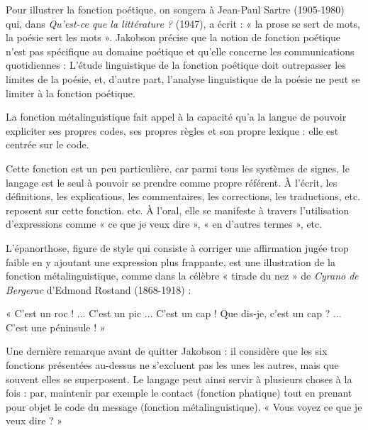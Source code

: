 \begin{bbcomplement}{}
Pour illustrer la fonction poétique, on songera à Jean-Paul Sartre (1905-1980) qui, dans \textit{Qu’est-ce que la littérature ?} (1947), a écrit : « la prose se sert de mots, la poésie sert les mots ». Jakobson précise que la notion de fonction poétique n’est pas spécifique au domaine poétique et qu’elle concerne les communications quotidiennes :
L’étude linguistique de la fonction poétique doit outrepasser les limites de la poésie, et, d’autre part, l’analyse linguistique de la poésie ne peut se limiter à la fonction poétique.
\end{bbcomplement}

La fonction métalinguistique fait appel à la capacité qu’a la langue de pouvoir expliciter ses propres codes, ses propres règles et son propre lexique : elle est centrée sur le code.

Cette fonction est un peu particulière, car parmi tous les systèmes de signes, le langage est le seul à pouvoir se prendre comme propre référent. À l’écrit, les définitions, les explications, les commentaires, les corrections, les traductions, etc. reposent sur cette fonction. etc. À l’oral, elle se manifeste à travers l’utilisation d’expressions comme « ce que je veux dire », « en d’autres termes », etc.

\begin{bbcomplement}{}
L’épanorthose, figure de style qui consiste à corriger une affirmation jugée trop faible en y ajoutant une expression plus frappante, est une illustration de la fonction métalinguistique, comme dans la célèbre « tirade du nez » de \textit{Cyrano de Bergerac} d’Edmond Rostand (1868-1918) :

« C’est un roc ! ... C’est un pic ... C’est un cap ! Que dis-je, c’est un cap ? ... C’est une péninsule ! »
\end{bbcomplement}

Une dernière remarque avant de quitter Jakobson : il considère que les six fonctions présentées au-dessus ne s’excluent pas les unes les autres, mais que souvent elles se superposent. Le langage peut ainsi servir à plusieurs choses à la fois : par, maintenir par exemple le contact (fonction phatique) tout en prenant pour objet le code du message (fonction métalinguistique). « Vous voyez ce que je veux dire ? »

